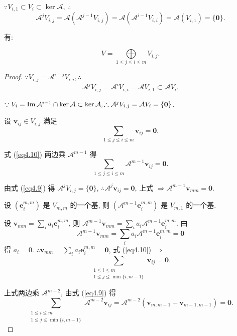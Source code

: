\documentclass[color=black,device=normal,lang=cn,mode=geye]{elegantnote}
\begin{document}
$\because V_{i,1}\subset V_i\subset\ker\mathcal{A}$, $\therefore$
\begin{equation}\label{eq4.9}
    \mathcal{A}^jV_{i,j}=\mathcal{A}(\mathcal{A}^{j-1}V_{i,j})=\mathcal{A}(\mathcal{A}^{i-1}V_{i,i})=\mathcal{A}(V_{i,1})=\{\boldsymbol{0}\}.
\end{equation}

有:
\begin{theorem}\label{t4.3}
    \[V=\bigoplus\limits_{1\leq j\leq i\leq m}V_{i,j}.\]
\end{theorem}
\begin{proof}
    $\because V_{i,j}=\mathcal{A}^{i-j}V_{i,i},\therefore$
    \[\mathcal{A}^jV_{i,j}=\mathcal{A}^iV_{i,i}=\mathcal{A}V_{i,1}\subset\mathcal{A}V_i.\]

    $\because V_i=\operatorname{Im} \mathcal{A}^{i-1}\cap\ker\mathcal{A}\subset\ker\mathcal{A},\therefore\mathcal{A}^jV_{i,j}=\mathcal{A}V_i=\{\boldsymbol{0}\}$.

    设 $\boldsymbol{v}_{ij}\in V_{i,j}$ 满足
    \begin{equation}\label{eq4.10}
        \sum\limits_{1\leq j\leq i\leq m}\boldsymbol{v}_{ij}=\boldsymbol{0}.
    \end{equation}

    式 (\ref{eq4.10}) 两边乘 $\mathcal{A}^{m-1}$ 得
    \[\sum\limits_{1\leq j\leq i\leq m}\mathcal{A}^{m-1}\boldsymbol{v}_{ij}=\boldsymbol{0}.\]

    由式 (\ref{eq4.9}) 得 $\mathcal{A}^jV_{i,j}=\{\boldsymbol{0}\}$, $\therefore\mathcal{A}^j\boldsymbol{v}_{ij}=\boldsymbol{0}$, 上式 $\Rightarrow\mathcal{A}^{m-1}\boldsymbol{v}_{mm}=\boldsymbol{0}$.

    设 $(\boldsymbol{e}_i^{m,m})$ 是 $V_{m,m}$ 的一个基, 则 $(\mathcal{A}^{m-1}\boldsymbol{e}_i^{m,m})$ 是 $V_{m,1}$ 的一个基.
    
    设 $\boldsymbol{v}_{mm}=\sum\limits_ia_i\boldsymbol{e}_i^{m,m}$, 则 $\mathcal{A}^{m-1}\boldsymbol{v}_{mm}=\sum\limits_ia_i\mathcal{A}^{m-1}\boldsymbol{e}_i^{m,m}$. 由
    \[\mathcal{A}^{m-1}\boldsymbol{v}_{mm}=\sum\limits_ia_i\mathcal{A}^{m-1}\boldsymbol{e}_i^{m,m}=\boldsymbol{0}\]
    得 $a_i=0$. $\therefore \boldsymbol{v}_{mm}=\sum\limits_ia_i\boldsymbol{e}_i^{m,m}=\boldsymbol{0}$, 式 (\ref{eq4.10}) $\Rightarrow$
    \[\sum\limits_{\substack{1\leq i\leq m\\1\leq j\leq\min\{i,m-1\}}}\boldsymbol{v}_{ij}=\boldsymbol{0}.\]
    
    上式两边乘 $\mathcal{A}^{m-2}$, 由式 (\ref{eq4.9}) 得
    \[\sum\limits_{\substack{1\leq i\leq m\\1\leq j\leq\min\{i,m-1\}}}\mathcal{A}^{m-2}\boldsymbol{v}_{ij}=\mathcal{A}^{m-2}(\boldsymbol{v}_{m,m-1}+\boldsymbol{v}_{m-1,m-1})=\boldsymbol{0}.\]


\end{proof}
\end{document}
